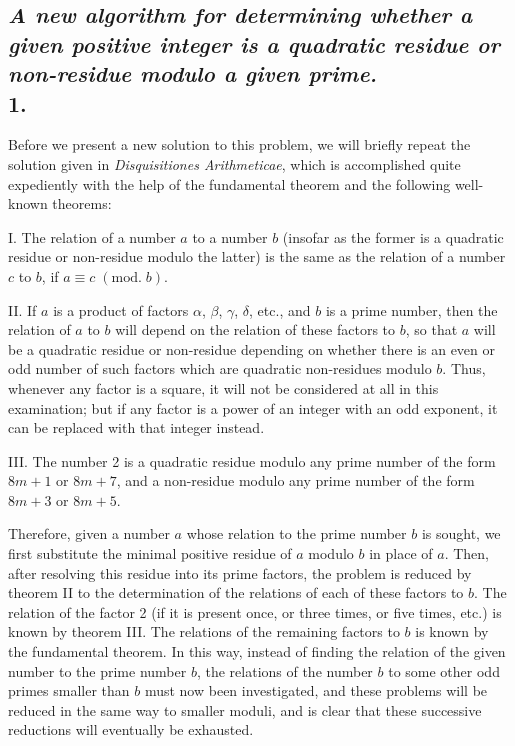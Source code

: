 \documentclass[twoside,12pt]{memoir}
\renewcommand{\pmod}[1]{\;(\textrm{mod.}\;#1)}
\begin{document}
\subsection*{{\scriptsize \textit{A new algorithm for determining whether a given positive integer is a quadratic residue or non-residue modulo a given prime.}}\\
1.}

Before we present a new solution to this problem, we will briefly repeat the solution given in \textit{Disquisitiones Arithmeticae}, which is accomplished quite expediently with the help of the fundamental theorem and the following well-known theorems:

I. The relation of a number \(a\) to a number \(b\) (insofar as the former is a quadratic residue or non-residue modulo the latter) is the same as the relation of a number \(c\) to \(b\), if \(a \equiv c\pmod{b}\).

II. If \(a\) is a product of factors \(\alpha\), \(\beta\), \(\gamma\), \(\delta\), etc{.}, and \(b\) is a prime number, then the relation of \(a\) to \(b\) will depend on the relation of these factors to \(b\), so that \(a\) will be a quadratic residue or non-residue depending on whether there is an even or odd number of such factors which are quadratic non-residues modulo \(b\). Thus, whenever any factor is a square, it will not be considered at all in this examination; but if any factor is a power of an integer with an odd exponent, it can be replaced with that integer instead.

III. The number 2 is a quadratic residue modulo any prime number of the form \(8m+1\) or \(8m+7\), and a non-residue modulo any prime number of the form \(8m+3\) or \(8m+5\).

Therefore, given a number \(a\) whose relation to the prime number \(b\) is sought, we first substitute the minimal positive residue of \(a\) modulo \(b\) in place of \(a\). Then, after resolving this residue into its prime factors, the problem is reduced by theorem II to the determination of the relations of each of these factors to \(b\). The relation of the factor 2 (if it is present once, or three times, or five times, etc{.}) is known by theorem III.  The relations of the remaining factors to \(b\) is known by the fundamental theorem. In this way, instead of finding the relation of the given number to the prime number \(b\), the relations of the number \(b\) to some other odd primes smaller than \(b\) must now been investigated, and these problems will be reduced in the same way to smaller moduli, and is clear that these successive reductions will eventually be exhausted.
%
\end{document}
